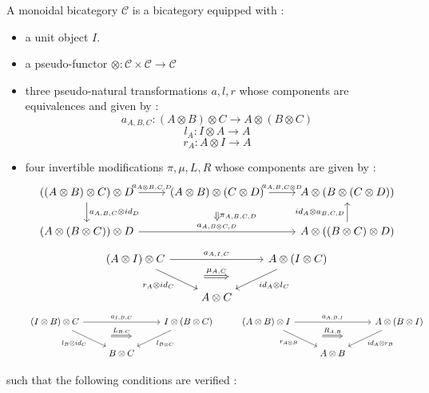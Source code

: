 \documentclass[10pt]{llncs}
\begin{document}
\begin{definition}
A monoidal bicategory $\mathcal{C}$ is a bicategory equipped with : 
\begin{itemize}
\item a unit object $I$.
\item a pseudo-functor $\otimes : \mathcal{C} \times \mathcal{C} \rightarrow \mathcal{C}$
\item three pseudo-natural transformations $a,l,r$ whose components are equivalences and given by : 
$$a_{A,B,C}: (A \otimes B) \otimes C \rightarrow A \otimes (B\otimes C)$$
$$l_A : I \otimes A \rightarrow A$$
$$r_A : A \otimes I \rightarrow A$$
\item four invertible modifications $\pi, \mu, L, R$ whose components are given by :
$$\begin{tikzcd}
((A \otimes B) \otimes C) \otimes D
\arrow{r}{a_{A \otimes B,C,D}}
\arrow{d}{a_{A,B,C} \otimes id_D}
&
(A \otimes B) \otimes (C \otimes D)
\arrow{r}{a_{A,B,C\otimes D}}
\arrow[Rightarrow,shorten >=0.3cm,shorten <=0.3cm]{d}{\pi_{A,B,C,D}}
&
A \otimes ( B \otimes (C \otimes D))
\\
(A \otimes (B \otimes C)) \otimes D
\arrow{rr}{a_{A, B\otimes C, D}}
&{}&
A \otimes ((B \otimes C) \otimes D)
\arrow{u}{id_A \otimes a_{B,C,D}}
\end{tikzcd}$$
$$\begin{tikzcd}
(A \otimes I) \otimes C
\arrow{rd}[swap]{r_A \otimes id_C} [name=T]{}
\arrow{rr}{a_{A,I,C}}
&&
A \otimes (I \otimes C)
\arrow{ld}{id_A \otimes l_C} [swap,name=V]{}
 \arrow[Rightarrow, shorten >=0.7cm, shorten <=0.7cm,from=T, to=V,"\mu_{A,C}"]
\\
&
A \otimes C
&
\end{tikzcd}$$
$$\begin{tikzcd}
(I \otimes B) \otimes C
\arrow{rd}[swap]{l_B \otimes id_C} [name=T]{}
\arrow{rr}{a_{I,B,C}}
&&
I \otimes (B \otimes C)
\arrow{ld}{l_{B\otimes C}} [swap,name=V]{}
 \arrow[Rightarrow, shorten >=0.7cm, shorten <=0.7cm,from=T, to=V,"L_{B,C}"]
 &
 (A \otimes B) \otimes I
\arrow{rd}[swap]{r_{A \otimes B}} [name=Y]{}
\arrow{rr}{a_{A,B,I}}
&&
A \otimes (B \otimes I)
\arrow{ld}{id_A \otimes r_B} [swap,name=U]{}
 \arrow[Rightarrow, shorten >=0.7cm, shorten <=0.7cm,from=Y, to=U,"R_{A,B}"]
\\
&
B \otimes C
&
&
&
A \otimes B
&
\end{tikzcd}$$
\end{itemize}
such that the following conditions are verified :
\begin{itemize}

\end{itemize}
\end{definition}
\end{document}
